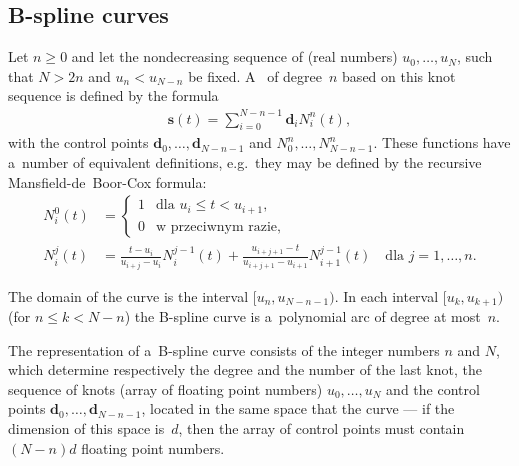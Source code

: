 \subsection{\label{ssect:BSC}B-spline curves}

Let $n\geq 0$ and let the nondecreasing sequence of  (real numbers)
$u_0,\ldots,u_N$, such that $N>2n$ and $u_n<u_{N-n}$ be fixed.
A~ of degree~$n$ based on this knot sequence is defined
by the formula
\begin{align}\label{eq:BScurve:def}
  \bm{s}(t) = \sum_{i=0}^{N-n-1} \bm{d}_iN^n_i(t),
\end{align}
with the control points $\bm{d}_0,\ldots,\bm{d}_{N-n-1}$ and
 $N^n_0,\ldots,N^n_{N-n-1}$. These functions have
a~number of equivalent definitions, e.g.\ they may be defined by the
recursive Mansfield-de~Boor-Cox formula:
\begin{align}\label{eq:BS:basis0}
  N^0_i(t) &{}= \left\{\begin{array}{ll}1 & \mbox{dla $u_i\leq t<u_{i+1}$,} \\
    0 & \mbox{w przeciwnym razie,} \end{array}\right. \\
  \label{eq:BS:basisn}
  N^j_i(t) &{}= \frac{t-u_i}{u_{i+j}-u_i} N^{j-1}_i(t) +
    \frac{u_{i+j+1}-t}{u_{i+j+1}-u_{i+1}} N^{j-1}_{i+1}(t)\quad
    \mbox{dla $j=1,\ldots,n$}.
\end{align}

The domain of the curve is the interval $[u_n,u_{N-n-1})$. In each interval
$[u_k,u_{k+1})$ (for $n\leq k<N-n$) the B-spline curve is a~polynomial arc
of degree at most~$n$.

The representation of a~B-spline curve consists of the integer numbers
$n$ and $N$, which determine respectively the degree and the
number of the last knot, the sequence of knots (array of floating point numbers)
$u_0,\ldots,u_N$ and the control points $\bm{d}_0,\ldots,\bm{d}_{N-n-1}$,
located in the same space that the curve --- if the dimension of this space is~$d$,
then the array of control points must contain $(N-n)d$ floating point numbers.

